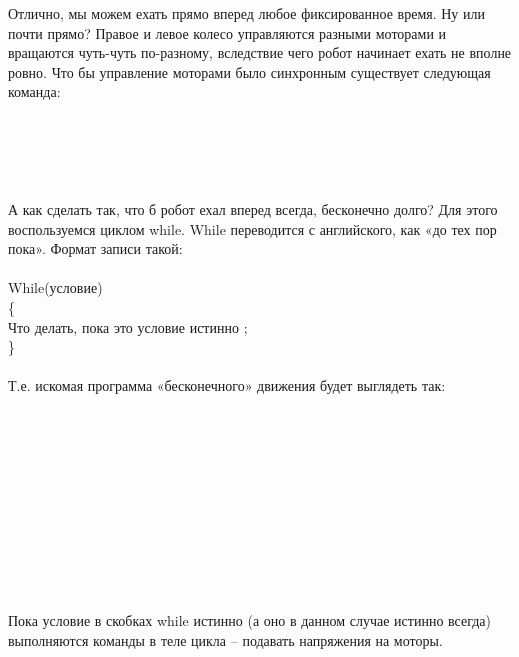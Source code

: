 Отлично, мы можем ехать прямо вперед любое фиксированное время. Ну или почти прямо?  Правое и левое колесо управляются разными моторами и вращаются чуть-чуть по-разному, вследствие чего робот начинает ехать не вполне ровно. Что бы управление моторами было синхронным существует следующая команда:\\\\

{\programm
	\indent {} \indent {}\\
	\indent {} \indent {}\\
}\\\\

А как сделать так, что б робот ехал вперед всегда, бесконечно долго? Для этого воспользуемся циклом while. While переводится с английского,  как «до тех пор пока». Формат записи такой:\\\\

\indent While(условие)\\
\indent \{\\
\indent\indent Что делать, пока это условие истинно ;\\	
\indent \}\\\\

Т.е. искомая программа «бесконечного» движения будет выглядеть так:\\\\

{\programm
	{\slshape{}}\rC{()}\\
	\rC{\{}\\
	\\
	\indent\rC{\{}\\
	\indent\indent{}\\
	\indent\indent{}\\
	\indent\rC{\}}\\
	\rC{\}}\\
}\\\\

Пока условие в скобках while истинно (а оно в данном случае истинно всегда) выполняются команды в теле цикла – подавать напряжения на моторы.

